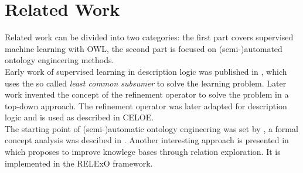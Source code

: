 \section{Related Work}
Related work can be divided into two categories: the first part covers
supervised machine learning with OWL, the second part is focused on
(semi-)automated ontology engineering methods.
\\
Early work of supervised learning in description logic was published in
\cite{related_9,related_10}, which uses the so called \emph{least common
subsumer} to solve the learning problem. Later work invented the concept of the
refinement operator to solve the problem in a top-down
approach.\cite{related_7} The refinement operator was later adapted for
description logic \cite{refinement1,refinement2,refinement3} and is used as described in
CELOE.
\\
The starting point of (semi-)automatic ontology engineering was set by
\cite{related_31}, a formal concept analysis was descibed in \cite{related_5}.
Another interesting approach is presented in \cite{related_relexo} which
proposes to improve knowlege bases through relation exploration. It is
implemented in the RELExO framework.